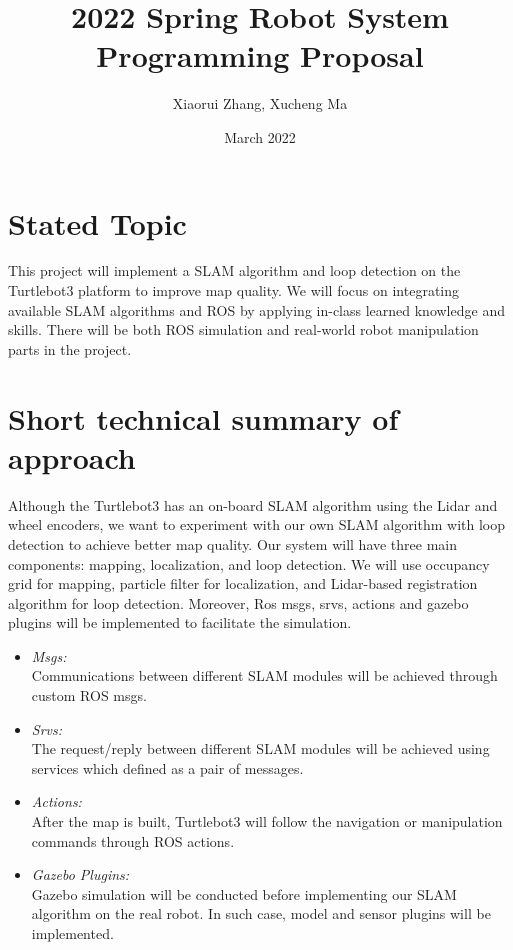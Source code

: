\documentclass[11pt]{article} \usepackage[top=1in, bottom=1in, left=1in, right=1in]{geometry}
\title{2022 Spring Robot System Programming Proposal }
\author{Xiaorui Zhang, Xucheng Ma}
\date{March 2022}
\begin{document}
\maketitle

\section{Stated Topic}
This project will implement a SLAM algorithm and loop detection on the Turtlebot3 platform to improve map quality. We will focus on integrating available SLAM algorithms and ROS by applying in-class learned knowledge and skills. There will be both ROS simulation and real-world robot manipulation parts in the project.

\section{Short technical summary of approach}
Although the Turtlebot3 has an on-board SLAM algorithm using the Lidar and wheel encoders, we want to experiment with our own SLAM algorithm with loop detection to achieve better map quality. Our system will have three main components: mapping, localization, and loop detection. We will use occupancy grid for mapping, particle filter for localization, and Lidar-based registration algorithm for loop detection. Moreover, Ros msgs, srvs, actions and gazebo plugins will be implemented to facilitate the simulation. 
\begin{itemize}
    \item \textit{Msgs:}\\
    Communications between different SLAM modules will be achieved through custom ROS msgs. 
    \item \textit{Srvs:}\\
   The request/reply between different SLAM modules will be achieved using services which defined as a pair of messages.
   \item \textit{Actions:}\\
   After the map is built, Turtlebot3 will follow the navigation or manipulation commands through ROS actions.
   \item \textit{Gazebo Plugins:}\\
   Gazebo simulation will be conducted before implementing our SLAM algorithm on the real robot. In such case, model and sensor plugins will be implemented.  
\end{itemize}
\end{document}
